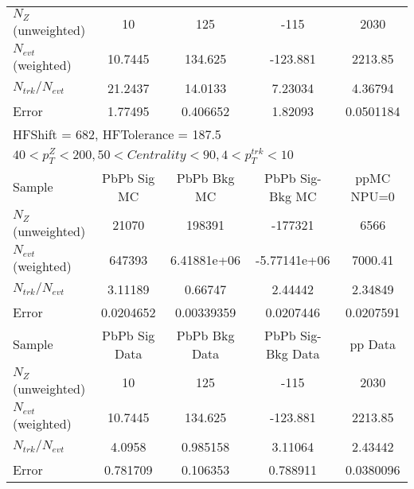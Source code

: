 \begin{table}[h!]
\begin{tabular}{|l|c|c|c|c|}
$N_Z$ (unweighted)& 10             & 125            & -115           & 2030           \\
$N_{evt}$ (weighted)& 10.7445        & 134.625        & -123.881       & 2213.85        \\
$N_{trk}/N_{evt}$& 21.2437        & 14.0133        & 7.23034        & 4.36794        \\
Error          & 1.77495        & 0.406652       & 1.82093        & 0.0501184      \\
\hline\hline
\multicolumn{5}{l}{ HFShift = 682, HFTolerance = 187.5}\\
\multicolumn{5}{l}{ $40 < p_{T}^{Z} < 200, 50 < Centrality < 90, 4 < p_{T}^{trk} < 10$}\\
\hline\hline
Sample         & PbPb Sig MC    & PbPb Bkg MC    & PbPb Sig-Bkg MC& ppMC NPU=0     \\
$N_Z$ (unweighted)& 21070          & 198391         & -177321        & 6566           \\
$N_{evt}$ (weighted)& 647393         & 6.41881e+06    & -5.77141e+06   & 7000.41        \\
$N_{trk}/N_{evt}$& 3.11189        & 0.66747        & 2.44442        & 2.34849        \\
Error          & 0.0204652      & 0.00339359     & 0.0207446      & 0.0207591      \\
\hline
Sample         & PbPb Sig Data  & PbPb Bkg Data  & PbPb Sig-Bkg Data& pp Data  \\
$N_Z$ (unweighted)& 10             & 125            & -115           & 2030           \\
$N_{evt}$ (weighted)& 10.7445        & 134.625        & -123.881       & 2213.85        \\
$N_{trk}/N_{evt}$& 4.0958         & 0.985158       & 3.11064        & 2.43442        \\
Error          & 0.781709       & 0.106353       & 0.788911       & 0.0380096      \\
\hline\hline
\end{tabular}
\end{table}
\clearpage

